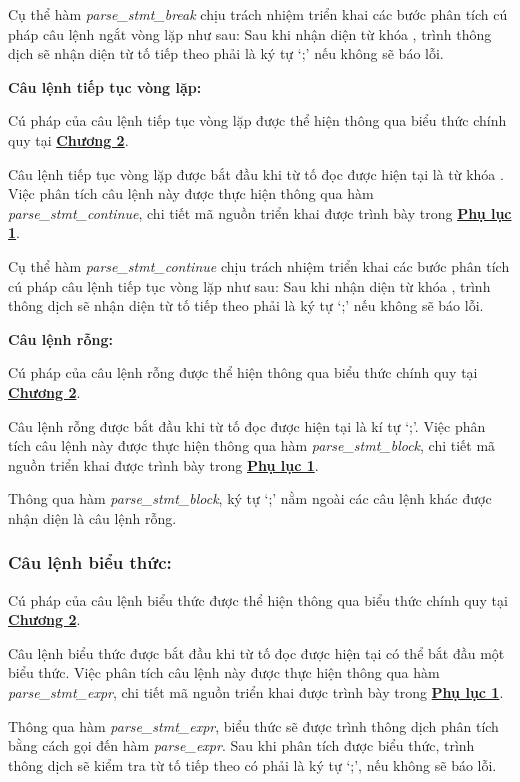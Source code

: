 Cụ thể hàm \textit{parse\_stmt\_break} chịu trách nhiệm triển khai các bước phân tích cú pháp câu lệnh ngắt vòng lặp như sau: Sau khi nhận diện từ khóa , trình thông dịch sẽ nhận diện từ tố tiếp theo phải là ký tự `;' nếu không sẽ báo lỗi.


\textbf{Câu lệnh tiếp tục vòng lặp:}

Cú pháp của câu lệnh tiếp tục vòng lặp được thể hiện thông qua biểu thức chính quy tại \hyperref[ch2:block_stmt]{\bf Chương 2}.

Câu lệnh tiếp tục vòng lặp được bắt đầu khi từ tố đọc được hiện tại là từ khóa . Việc phân tích câu lệnh này được thực hiện thông qua hàm \\\textit{parse\_stmt\_continue}, chi tiết mã nguồn triển khai được trình bày trong \hyperref[ap1:stmt_skip]{\bf Phụ lục 1}. %

Cụ thể hàm \textit{parse\_stmt\_continue} chịu trách nhiệm triển khai các bước phân tích cú pháp câu lệnh tiếp tục vòng lặp như sau:
Sau khi nhận diện từ khóa , trình thông dịch sẽ nhận diện từ tố tiếp theo phải là ký tự `;' nếu không sẽ báo lỗi.

\textbf{Câu lệnh rỗng:}

Cú pháp của câu lệnh rỗng được thể hiện thông qua biểu thức chính quy tại \hyperref[ch2:block_stmt]{\bf Chương 2}.

Câu lệnh rỗng được bắt đầu khi từ tố đọc được hiện tại là kí tự `;'. Việc phân tích câu lệnh này được thực hiện thông qua hàm \textit{parse\_stmt\_block}, chi tiết mã nguồn triển khai được trình bày trong \hyperref[ap1:stmts_emicolon]{\bf Phụ lục 1}.

Thông qua hàm \textit{parse\_stmt\_block}, ký tự `;' nằm ngoài các câu lệnh khác được nhận diện là câu lệnh rỗng.

\subsubsection{Câu lệnh biểu thức:} 
Cú pháp của câu lệnh biểu thức được thể hiện thông qua biểu thức chính quy tại \hyperref[ch2:expr_stmt]{\bf Chương 2}.

Câu lệnh biểu thức được bắt đầu khi từ tố đọc được hiện tại có thể bắt đầu một biểu thức. Việc phân tích câu lệnh này được thực hiện thông qua hàm \textit{parse\_stmt\_expr}, chi tiết mã nguồn triển khai được trình bày trong \hyperref[ap1:stmt_expr]{\bf Phụ lục 1}. %

Thông qua hàm \textit{parse\_stmt\_expr}, biểu thức sẽ được trình thông dịch phân tích bằng cách gọi đến hàm \textit{parse\_expr}. Sau khi phân tích được biểu thức, trình thông dịch sẽ kiểm tra từ tố tiếp theo có phải là ký tự `;', nếu không sẽ báo lỗi.

